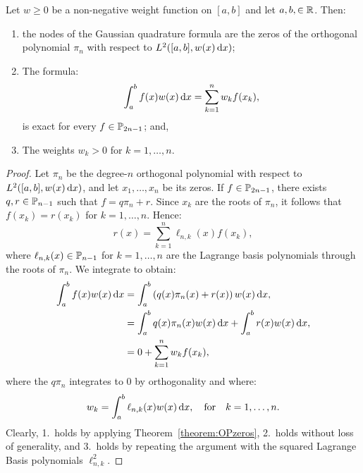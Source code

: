 \begin{theorem}\label{theorem:Gaussnodesandweights}
Let $w\ge0$ be a non-negative weight function on $[a,b]$ and let $a,b,\in\R$. Then:
\begin{enumerate}
\item the nodes of the Gaussian quadrature formula are the zeros of the orthogonal polynomial $\pi_n$ with respect to $L^2([a,b],w(x)\ud x)$;
\item The formula:
\[
\int_a^bf(x)w(x)\ud x = \sum_{k=1}^n w_kf(x_k),
\]
is exact for every $f\in\P_{2n-1}$; and,
\item The weights $w_k>0$ for $k=1,\ldots,n$.
\end{enumerate}
\end{theorem}
\begin{proof}
Let $\pi_n$ be the degree-$n$ orthogonal polynomial with respect to $L^2([a,b],w(x)\ud x)$, and let $x_1,\ldots,x_n$ be its zeros. If $f\in\P_{2n-1}$, there exists $q,r\in\P_{n-1}$ such that $f = q\pi_n + r$. Since $x_k$ are the roots of $\pi_n$, it follows that $f(x_k) = r(x_k)$ for $k=1,\ldots,n$. Hence:
\[
r(x) = \sum_{k=1}^n \ell_{n,k}(x) f(x_k),
\]
where $\ell_{n,k}(x)\in\P_{n-1}$ for $k=1,\ldots,n$ are the Lagrange basis polynomials through the roots of $\pi_n$. We integrate to obtain:
\begin{align*}
\int_a^b f(x)w(x)\ud x & = \int_a^b\left(q(x)\pi_n(x)+r(x)\right)w(x)\ud x,\\
& = \int_a^b q(x)\pi_n(x)w(x)\ud x + \int_a^br(x) w(x)\ud x,\\
& = 0 + \sum_{k=1}^nw_kf(x_k),
\end{align*}
where the $q\pi_n$ integrates to $0$ by orthogonality and where:
\[
w_k = \int_a^b \ell_{n,k}(x)w(x)\ud x,\quad{\rm for}\quad k=1,\ldots,n.
\]
Clearly, 1.~holds by applying Theorem~\ref{theorem:OPzeros}, 2.~holds without loss of generality, and 3.~holds by repeating the argument with the squared Lagrange Basis polynomials $\ell_{n,k}^2$.
\end{proof}

